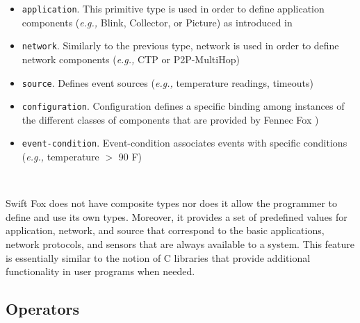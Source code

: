 \begin{itemize}
	\item \texttt{application}. This primitive type is used in order to
	define application components (\textit{e.g.,} Blink, Collector, or
	Picture) as introduced in \cite{marcin:tutorial}
	\item \texttt{network}. Similarly to the previous type, network
	is used in order to define network components (\textit{e.g.,}
	CTP or P2P-MultiHop)
	\item \texttt{source}. Defines event sources (\textit{e.g.,}
	temperature readings, timeouts)
	\item \texttt{configuration}. Configuration defines a specific
	binding among instances of the different classes of components
	that are provided by Fennec Fox \cite{marcin:tutorial})
	\item \texttt{event-condition}. Event-condition associates events
	with specific conditions (\textit{e.g.,} temperature $>$ 90 F)
\end{itemize}

\

\hangindent=4cm
\small
\noindent
Swift Fox does not have composite types nor does it allow the programmer to
define and use its own types. Moreover, it provides a set of predefined
values for application, network, and source that correspond to the basic
applications, network protocols, and sensors that are always available to a
system. This feature is essentially similar to the notion of C libraries
that provide additional functionality in user programs when needed.
\normalsize

\subsection{Operators}

